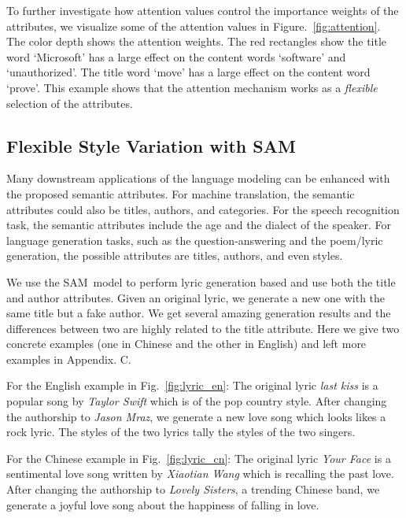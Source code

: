 \documentclass[a4paper]{article}
\newcommand{\method}{\xspace{SAM}}
\begin{document}
To further investigate how attention values control the importance weights of the attributes, we visualize some of the attention values in Figure.~\ref{fig:attention}. The color depth shows the attention weights. The red rectangles show the title word `Microsoft' has a large effect on the content words `software' and `unauthorized'. The title word `move' has a large effect on the content word `prove'. This example shows that the attention mechanism works as a \emph{flexible} selection of the attributes.
\subsection{Flexible Style Variation with \method}
Many downstream applications of the language modeling can be enhanced with the proposed semantic attributes. For machine translation, the semantic attributes could also be titles, authors, and categories. For the speech recognition task, the semantic attributes include the age and the dialect of the speaker. For language generation tasks, such as the question-answering and the poem/lyric generation, the possible attributes are titles, authors, and even styles.

We use the \method~model to perform lyric generation based and use both the title and author attributes.
Given an original lyric, we generate a new one with the same title but a fake author. We get several amazing generation results and the differences between two are highly related to the title attribute. Here we give two concrete examples (one in Chinese and the other in English) and left more examples in Appendix. C.

For the English example in Fig.~\ref{fig:lyric_en}: The original lyric \emph{last kiss} is a popular song by \emph{Taylor Swift} which is of the pop country style. After changing the authorship to \emph{Jason Mraz}, we generate a new love song which looks likes a rock lyric. The styles of the two lyrics tally the styles of the two singers.

For the Chinese example in Fig.~\ref{fig:lyric_cn}: The original lyric \emph{Your Face} is a sentimental love song written by \emph{Xiaotian Wang} which is recalling the past love. After changing the authorship to \emph{Lovely Sisters}, a trending Chinese band, we generate a joyful love song about the happiness of falling in love.

\end{document}
